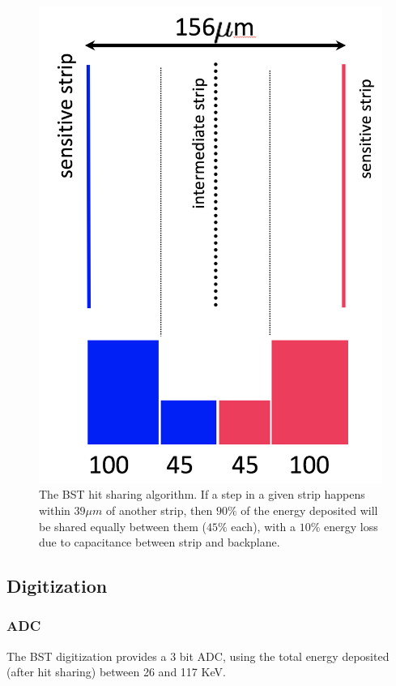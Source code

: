 \begin{figure}
	\centering
	\includegraphics[width=0.95\columnwidth,keepaspectratio]{img/bstHitSharing.png}
	\caption{The BST hit sharing algorithm. If a step in a given strip happens within $39 \mu m$ of another strip, then
            $90\%$ of the energy deposited will be shared equally between them ($45\%$ each), with a $10\%$ energy loss due
	         to capacitance between strip and backplane.}
	\label{fig:bstHitSharing}
\end{figure}


\subsection{Digitization}

\subsubsection{ADC}
The BST digitization provides a 3 bit ADC, using the total energy deposited (after hit sharing) between 26 and 117 KeV.

